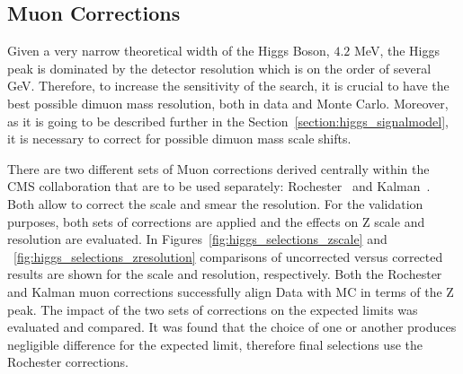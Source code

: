 \subsection{Muon Corrections}
Given a very narrow theoretical width of the Higgs Boson, $4.2$ MeV, the Higgs peak is dominated by the detector resolution which is on the order of several GeV. Therefore, to increase the sensitivity of the search, it is crucial to have the best possible dimuon mass resolution, both in data and Monte Carlo. Moreover, as it is going to be described further in the Section~\ref{section:higgs_signalmodel}, it is necessary to correct for possible dimuon mass scale shifts.

There are two different sets of Muon corrections derived centrally within the CMS collaboration that are to be used separately: Rochester~\cite{CMSRochesterCorrections} and Kalman~\cite{CMSKalmanCorrections}. Both allow to correct the scale and smear the resolution. For the validation purposes, both sets of corrections are applied and the effects on Z scale and resolution are evaluated. In Figures~\ref{fig:higgs_selections_zscale} and ~\ref{fig:higgs_selections_zresolution} comparisons of uncorrected versus corrected results are shown for the scale and resolution, respectively. Both the Rochester and Kalman muon corrections successfully align Data with MC in terms of the Z peak. The impact of the two sets of corrections on the expected limits was evaluated and compared. It was found that the choice of one or another produces negligible difference for the expected limit, therefore final selections use the Rochester corrections.
